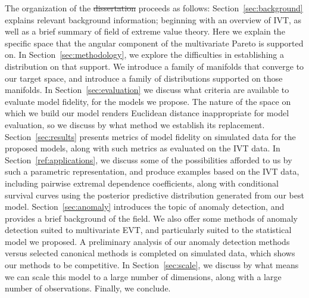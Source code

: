 The organization of the \st{dissertation}  proceeds as follows:
  Section~\ref{sec:background} explains relevant background information; beginning with an overview of
  IVT, as well as a brief summary of field of extreme value theory.  Here we explain the specific space
  that the angular component of the multivariate Pareto is supported on. In Section~\ref{sec:methodology},
  we explore the difficulties in establishing a distribution on that support.  We introduce a family of
  manifolds that converge to our target space, and introduce a family of distributions supported on those
  manifolds.  In Section~\ref{sec:evaluation} we discuss what criteria are available to evaluate model
  fidelity, for the models we propose.  The nature of the space on which we build our model renders Euclidean
  distance inappropriate for model evaluation, so we discuss by what method we establish its replacement.
  Section~\ref{sec:results} presents metrics of model fidelity on simulated data for the proposed models,
  along with such metrics as evaluated on the IVT data.  In Section~\ref{ref:applications}, we discuss
  some of the possibilities afforded to us by such a parametric representation, and produce examples
  based on the IVT data, including pairwise extremal dependence coefficients, along with conditional
  survival curves using the posterior predictive distribution generated from our best model.
  Section~\ref{sec:anomaly} introduces the topic of anomaly detection, and provides a brief background
  of the field.  We also offer some methods of anomaly detection suited to multivariate EVT, and
  particularly suited to the statistical model we proposed. A preliminary analysis of our anomaly
  detection methods versus selected canonical methods is completed on simulated data, which shows
  our methods to be competitive.  In Section~\ref{sec:scale}, we discuss by what means we can scale
  this model to a large number of dimensions, along with a large number of observations.  Finally, we
  conclude.


















